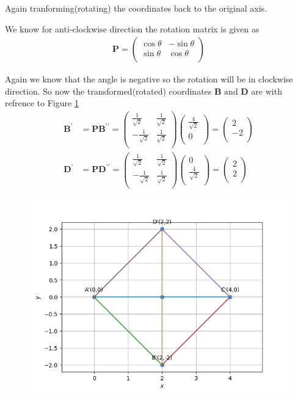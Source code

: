 \documentclass[12pt]{article}
\newcommand{\myvec}[1]{\ensuremath{\begin{pmatrix}#1\end{pmatrix}}}
\let\vec\mathbf
\begin{document}
\newpage
Again tranforming(rotating) the coordinates back to the original axis.

We know for anti-clockwise direction the rotation matrix is given as
\begin{align}
\vec{P} =
\myvec{
\cos\theta & -\sin\theta \\
\sin\theta & \cos\theta \\
}
\end{align}

Again we know that the angle is negative so the rotation will be in clockwise direction. So now the transformed(rotated) coordinates $\vec{B} \text{ and } \vec{D}$ are with refrence to Figure \ref{fig:Fig4}
\begin{align}
\vec{B^{\prime}} &= \vec{P}\vec{B^{\prime \prime}} = \myvec{
\frac{1}{\sqrt{2}} & \frac{1}{\sqrt{2}} \\
-\frac{1}{\sqrt{2}} & \frac{1}{\sqrt{2}}\\
}
\myvec{
 \frac{4}{\sqrt{2}}\\
 0\\
} = 
\myvec{
2 \\
-2\\
}\\
\vec{D^{\prime}} &= \vec{P}\vec{D^{\prime \prime}} = \myvec{
\frac{1}{\sqrt{2}} & \frac{1}{\sqrt{2}} \\
-\frac{1}{\sqrt{2}} & \frac{1}{\sqrt{2}}\\
}
\myvec{
 0\\
 \frac{4}{\sqrt{2}}\\
} = 
\myvec{
2 \\
2 \\
}
\end{align}

\begin{figure}[!h]
	\begin{center} 
	    \includegraphics[width=\columnwidth]{figs/square3}
	\end{center}
\caption{}
\label{fig:Fig4}
\end{figure}
\end{document}
